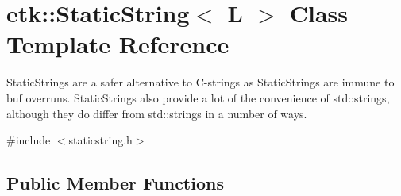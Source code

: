 \hypertarget{classetk_1_1_static_string}{\section{etk\-:\-:Static\-String$<$ L $>$ Class Template Reference}
\label{classetk_1_1_static_string}
}


Static\-Strings are a safer alternative to C-\/strings as Static\-Strings are immune to buf overruns. Static\-Strings also provide a lot of the convenience of std\-::strings, although they do differ from std\-::strings in a number of ways.  




{\ttfamily \#include $<$staticstring.\-h$>$}

\subsection*{Public Member Functions}
